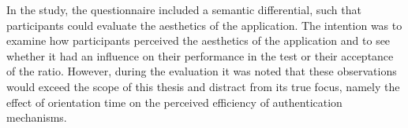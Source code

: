 In the study, the questionnaire included a semantic differential, such that participants could evaluate the aesthetics of the application. The intention was to examine how participants perceived the aesthetics of the application and to see whether it had an influence on their performance in the test or their acceptance of the ratio. However, during the evaluation it was noted that these observations would exceed the scope of this thesis and distract from its true focus, namely the effect of orientation time on the perceived efficiency of authentication mechanisms.  
